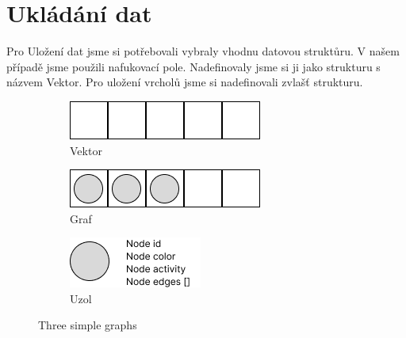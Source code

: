 \section{Ukládání dat}

Pro Uložení dat jsme si potřebovali vybraly vhodnu datovou struktůru. V našem případě jsme použili nafukovací pole.
Nadefinovaly jsme si ji jako strukturu s názvem Vektor. Pro uložení vrcholů jsme si nadefinovali zvlašť strukturu.

\begin{figure}[h]
    \centering
    \begin{subfigure}[b]{0.3\textwidth}
        \centering
        \includegraphics[width=\textwidth]{doc/fig/vector.png}
        \caption{Vektor}
        \label{fig:vector}
    \end{subfigure}
    \hfill
    \begin{subfigure}[b]{0.3\textwidth}
        \centering
        \includegraphics[width=\textwidth]{doc/fig/graph.png}
        \caption{Graf}
        \label{fig:graph}
    \end{subfigure}
    \hfill
    \begin{subfigure}[b]{0.3\textwidth}
        \centering
        \includegraphics[width=\textwidth]{doc/fig/node.png}
        \caption{Uzol}
        \label{fig:five over x}
    \end{subfigure}
    \caption{Three simple graphs}
    \label{fig:three graphs}
\end{figure}


